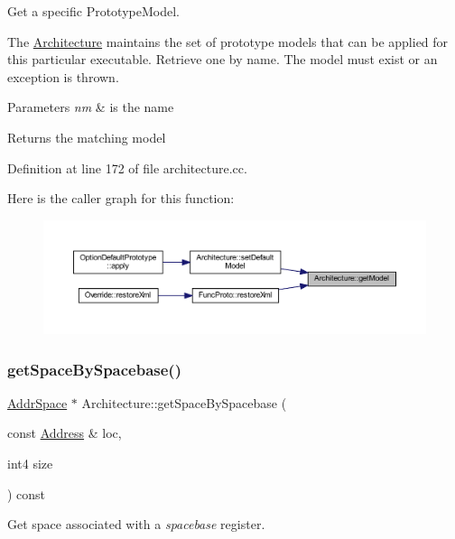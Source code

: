 Get a specific Prototype\+Model. 

The \mbox{\hyperlink{class_architecture}{Architecture}} maintains the set of prototype models that can be applied for this particular executable. Retrieve one by name. The model must exist or an exception is thrown. 
\begin{DoxyParams}{Parameters}
{\em nm} & is the name \\
\hline
\end{DoxyParams}
\begin{DoxyReturn}{Returns}
the matching model 
\end{DoxyReturn}


Definition at line 172 of file architecture.\+cc.

Here is the caller graph for this function\+:
\nopagebreak
\begin{figure}[H]
\begin{center}
\leavevmode
\includegraphics[width=350pt]{class_architecture_a03485a52fdf3b18f004ff4687d159a1e_icgraph}
\end{center}
\end{figure}
\mbox{\label{class_architecture_a6cef69bf3d546ca1012fcf5c017f7f3a}} 
\subsubsection{\texorpdfstring{getSpaceBySpacebase()}{getSpaceBySpacebase()}}
{\footnotesize\ttfamily \mbox{\hyperlink{class_addr_space}{Addr\+Space}} $\ast$ Architecture\+::get\+Space\+By\+Spacebase (\begin{DoxyParamCaption}\item[{const \mbox{\hyperlink{class_address}{Address}} \&}]{loc,  }\item[{int4}]{size }\end{DoxyParamCaption}) const}



Get space associated with a {\itshape spacebase} register. 

